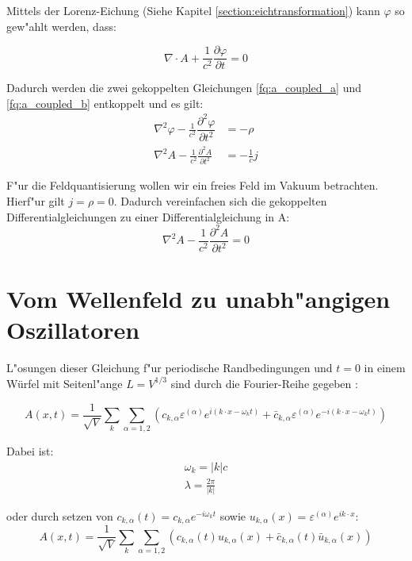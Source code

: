 Mittels der Lorenz-Eichung (Siehe Kapitel \ref{section:eichtransformation}) kann $\varphi$ so gew"ahlt werden, dass:

\begin{equation} \label{fq:lorenz_eq}
\nabla \cdot A + \frac{1}{c^2} \frac{\partial \varphi }{\partial t} = 0
\end{equation}

Dadurch werden die zwei gekoppelten Gleichungen \ref{fq:a_coupled_a} und \ref{fq:a_coupled_b} entkoppelt und es gilt:
\begin{align*}
\nabla^2 \varphi - \frac{1}{c^2} \dfrac{\partial^2 \varphi}{\partial t^2} &= -\rho \\
\nabla^2 A - \frac{1}{c^2} \frac{\partial^2 A }{\partial t^2} &= - \frac{1}{c} j
\end{align*}

F"ur die Feldquantisierung wollen wir ein freies Feld im Vakuum betrachten. Hierf"ur gilt $j = \rho = 0$.
Dadurch vereinfachen sich die gekoppelten Differentialgleichungen zu einer Differentialgleichung in A:
\begin{equation} \label{fq:wave_dgl}
\nabla^2 A - \frac{1}{c^2} \frac{\partial^2 A }{\partial t^2} = 0
\end{equation}

\section{Vom Wellenfeld zu unabh"angigen Oszillatoren}
L"osungen dieser Gleichung f"ur periodische Randbedingungen und $t=0$ in einem Würfel mit Seitenl"ange $L = V^{1/3}$ sind durch die Fourier-Reihe gegeben \cite{fq:em_wave_eq}:

\begin{equation} \label{fq:wave_eq}
A(x,t) = \frac{1}{\sqrt{V}} \sum_k \sum_{\alpha=1,2} \left(c_{k,\alpha} \varepsilon^{(\alpha)} e^{i (k \cdot x - \omega_k t)} + \bar{c}_{k,\alpha} \varepsilon^{(\alpha)} e^{-i(k \cdot x - \omega_k t)}\right)
\end{equation}

Dabei ist:
\begin{align*}
\omega_k=|k|c \\
\lambda = \frac{2 \pi}{|k|}
\end{align*}

oder durch setzen von $c_{k,\alpha}(t) = c_{k,\alpha} e^{-i \omega_k t}$ sowie $u_{k,\alpha}(x) = \varepsilon^{(\alpha)} e^{ik \cdot x}$:
\begin{equation*}
A(x,t) = \frac{1}{\sqrt{V}} \sum_k \sum_{\alpha=1,2} \left(c_{k,\alpha}(t)u_{k,\alpha}(x) + \bar{c}_{k,\alpha}(t) \bar{u}_{k,\alpha}(x) \right)
\end{equation*}

